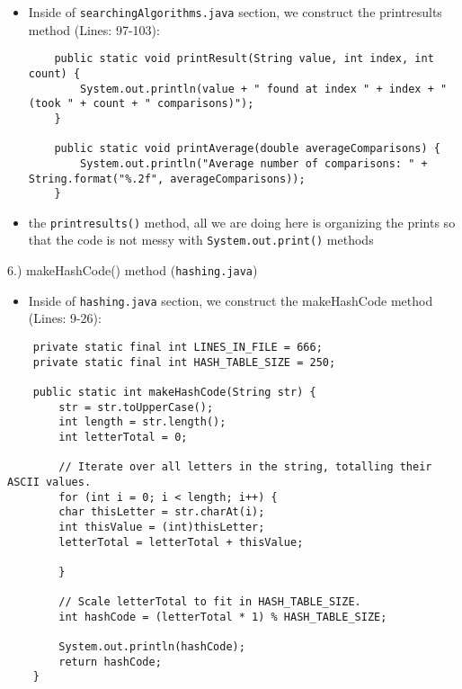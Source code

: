 \documentclass{article}
\begin{document}
\begin{itemize}
\item Inside of \verb|searchingAlgorithms.java| section, we construct the printresults method (Lines: 97-103):

\begin{verbatim}
	public static void printResult(String value, int index, int count) {
		System.out.println(value + " found at index " + index + " (took " + count + " comparisons)");
	}
	
	public static void printAverage(double averageComparisons) {
		System.out.println("Average number of comparisons: " + String.format("%.2f", averageComparisons));
	}
\end{verbatim}
\item the \verb|printresults()| method, all we are doing here is organizing the prints so that the code is not messy with \verb|System.out.print()| methods\\

\end{itemize}

\pagebreak

\begin{large}
    6.) makeHashCode() method (\verb|hashing.java|)
\end{large}

\begin{itemize}
\item Inside of \verb|hashing.java| section, we construct the makeHashCode method (Lines: 9-26):
\end{itemize}

\begin{verbatim}
    private static final int LINES_IN_FILE = 666;
    private static final int HASH_TABLE_SIZE = 250;

    public static int makeHashCode(String str) {
        str = str.toUpperCase();
        int length = str.length();
        int letterTotal = 0;

        // Iterate over all letters in the string, totalling their ASCII values.
        for (int i = 0; i < length; i++) {
        char thisLetter = str.charAt(i);
        int thisValue = (int)thisLetter;
        letterTotal = letterTotal + thisValue;

        }

        // Scale letterTotal to fit in HASH_TABLE_SIZE.
        int hashCode = (letterTotal * 1) % HASH_TABLE_SIZE;  

        System.out.println(hashCode);
        return hashCode;
    }
\end{verbatim}
\end{document}
